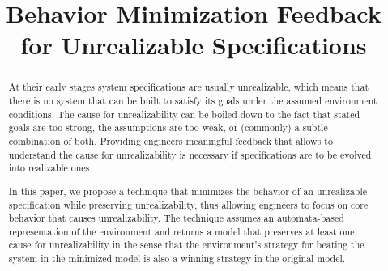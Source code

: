 \documentclass[sigconf,review,anonymous]{acmart}
\begin{document}

\title{Behavior Minimization Feedback for Unrealizable Specifications }


\author{
	\and
}
%




\begin{abstract}
At their early stages system specifications are usually unrealizable, which means that there is no system that can be built to satisfy its goals under
the assumed environment conditions. The cause for unrealizability can be
boiled down to the fact that stated goals are too strong, the assumptions are
too weak, or (commonly) a subtle combination of both.  Providing engineers meaningful
feedback that allows to understand the cause for unrealizability is
necessary if specifications are to be evolved into realizable ones.

In this paper, we propose a technique that minimizes the behavior of an
unrealizable \gr specification while preserving unrealizability, thus allowing
engineers to focus on core behavior that causes unrealizability. The technique assumes an automata-based representation of the environment
and returns a model that preserves at least one cause for unrealizability in the sense that the environment's strategy for beating the system in the minimized model is also a winning strategy in the original model. 

\end{abstract}
\end{document}
